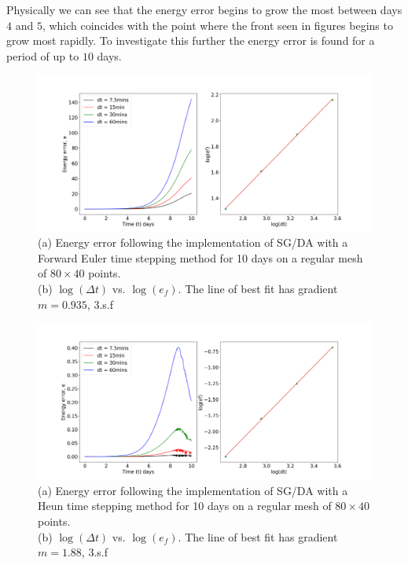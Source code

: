 \linebreak
Physically we can see that the energy error begins to grow the most between days $4$ and $5$, which coincides with the point where the front seen in figures  begins to grow most rapidly. To investigate this further the energy error is found for a period of up to $10$ days.
\begin{figure}[ht]
	\centering
	\includegraphics[width=0.9\linewidth]{evaluation/energy_10D_euler}
	\caption[Energy Error from implementation of SG/DA via Forward Euler timestepping method for 10 days]{(a) Energy error following the implementation of SG/DA with a Forward Euler time stepping method for 10 days on a regular mesh of $80 \times 40$ points.\\ (b) $\log(\Delta t)$ vs. $\log(e_f)$. The line of best fit has gradient $m = 0.935$, 3.s.f}
	\label{fig:energy10deuler}
\end{figure}
\begin{figure}[h]
	\includegraphics[width=0.9\linewidth]{evaluation/energy_10D_heun}
	\caption[Energy Error from implementation of SG/DA via Heun timestepping method for 10 days]{(a) Energy error following the implementation of SG/DA with a Heun time stepping method for 10 days on a regular mesh of $80 \times 40$ points.\\ 
		(b) $\log(\Delta t)$ vs. $\log(e_f)$. The line of best fit has gradient $m = 1.88$, 3.s.f}
	\label{fig:energy10dheun}
\end{figure}  
\pagebreak
